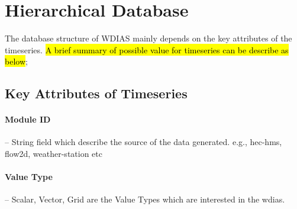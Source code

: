 \section{Hierarchical Database}
\label{se:db_struct}

The database structure of WDIAS mainly depends on the key attributes of the timeseries. \hl{A brief summary of possible value for timeseries can be describe as below};

\subsection{Key Attributes of Timeseries}
\label{subse:timeseries_key_attributes}
\paragraph{Module ID}-- String field which describe the source of the data generated. e.g., hec-hms, flow2d, weather-station etc

\paragraph{Value Type}-- Scalar, Vector, Grid are the Value Types which are interested in the \acrshort{wdias}.

